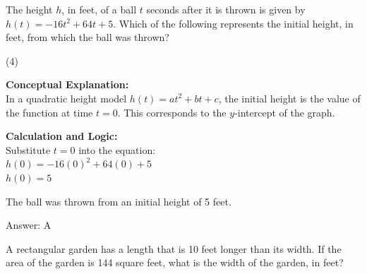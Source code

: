 \documentclass[11pt,paper=a4,answers]{exam}
\begin{document}
\begin{questions}
\pointsinrightmargin
\pointsdroppedatright
\marksnotpoints
{}
\pointformat{\boldmath\themarginpoints}
\bracketedpoints



\question
The height $h$, in feet, of a ball $t$ seconds after it is thrown is given by $h(t) = -16t^2 + 64t + 5$. Which of the following represents the initial height, in feet, from which the ball was thrown?
\begin{tasks}(4)
\end{tasks}

\begin{solution}
\textbf{Conceptual Explanation:} \\
In a quadratic height model $h(t) = at^2 + bt + c$, the initial height is the value of the function at time $t = 0$. This corresponds to the $y$-intercept of the graph.

\vspace{20pt}

\textbf{Calculation and Logic:} \\
Substitute $t = 0$ into the equation: \\
$h(0) = -16(0)^2 + 64(0) + 5$ \\
$h(0) = 5$

\vspace{10pt}

The ball was thrown from an initial height of 5 feet.

\vspace{25pt}

Answer: \colorbox{yellow!100}{A}
\end{solution}

\vspace{40pt}

\question
A rectangular garden has a length that is 10 feet longer than its width. If the area of the garden is 144 square feet, what is the width of the garden, in feet?


\end{questions}
\end{document}
